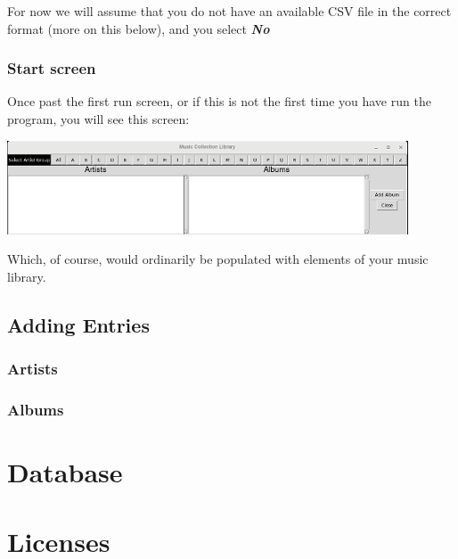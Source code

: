 \documentclass[12pt,a4paper,final,twoside,titlepage]{book}
\begin{document}
For now we will assume that you do not have an available CSV file in the correct format (more on this below), and you select \textbf{\textit{No}}

\section{Start screen}
Once past the first run screen, or if this is not the first time you have run the program, you will see this screen:

\includegraphics[scale=1]{Images/firstScreen.png}

Which, of course, would ordinarily be populated with elements of your music library.

\chapter{Adding Entries}
\section{Artists}
\section{Albums}
\part{Database}

\part{Licenses}

\newpage

\end{document}
